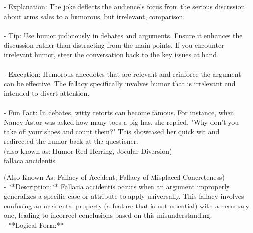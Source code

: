 \documentclass[a4paper,12pt,single,pdftex]{scrartcl}
\begin{document}
    
        - Explanation: The joke deflects the audience's focus from the serious discussion about arms sales to a humorous, but irrelevant, comparison.
    \\

    
      
    \\

    
      - Tip: Use humor judiciously in debates and arguments. Ensure it enhances the discussion rather than distracting from the main points. If you encounter irrelevant humor, steer the conversation back to the key issues at hand.
    \\

    
      
    \\

    
      - Exception: Humorous anecdotes that are relevant and reinforce the argument can be effective. The fallacy specifically involves humor that is irrelevant and intended to divert attention.
    \\

    
      
    \\

    
      - Fun Fact: In debates, witty retorts can become famous. For instance, when Nancy Astor was asked how many toes a pig has, she replied, "Why don’t you take off your shoes and count them?" This showcased her quick wit and redirected the humor back at the questioner.
    \\

  
    
      (also known as: Humor Red Herring, Jocular Diversion)
    \\

  

fallaca ancidentis
    
      (Also Known As: Fallacy of Accident, Fallacy of Misplaced Concreteness)
    \\

  
    
      - **Description:** Fallacia accidentis occurs when an argument improperly generalizes a specific case or attribute to apply universally. This fallacy involves confusing an accidental property (a feature that is not essential) with a necessary one, leading to incorrect conclusions based on this misunderstanding.
    \\

    
      - **Logical Form:**
    \\
\end{document}
